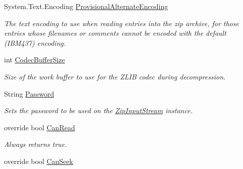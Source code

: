 \begin{DoxyCompactItemize}
\item 
System.\+Text.\+Encoding \mbox{\hyperlink{class_super_tiled2_unity_1_1_ionic_1_1_zip_1_1_zip_input_stream_a0b2b02e8e22ba92c63f7a77852abf062}{Provisional\+Alternate\+Encoding}}
\begin{DoxyCompactList}\small\item\em The text encoding to use when reading entries into the zip archive, for those entries whose filenames or comments cannot be encoded with the default (I\+B\+M437) encoding. \end{DoxyCompactList}\item 
int \mbox{\hyperlink{class_super_tiled2_unity_1_1_ionic_1_1_zip_1_1_zip_input_stream_af44fff57aee1d3076896571b3e102937}{Codec\+Buffer\+Size}}
\begin{DoxyCompactList}\small\item\em Size of the work buffer to use for the Z\+L\+IB codec during decompression. \end{DoxyCompactList}\item 
String \mbox{\hyperlink{class_super_tiled2_unity_1_1_ionic_1_1_zip_1_1_zip_input_stream_a152dfe460b16330a160db99eeffcf07c}{Password}}
\begin{DoxyCompactList}\small\item\em Sets the password to be used on the {\ttfamily \mbox{\hyperlink{class_super_tiled2_unity_1_1_ionic_1_1_zip_1_1_zip_input_stream}{Zip\+Input\+Stream}}} instance. \end{DoxyCompactList}\item 
override bool \mbox{\hyperlink{class_super_tiled2_unity_1_1_ionic_1_1_zip_1_1_zip_input_stream_a5d96ce8da0a2f65670eddfc56dae1a21}{Can\+Read}}
\begin{DoxyCompactList}\small\item\em Always returns true. \end{DoxyCompactList}\item 
override bool \mbox{\hyperlink{class_super_tiled2_unity_1_1_ionic_1_1_zip_1_1_zip_input_stream_ac37e847bafaafa0cf3f7713f5e6119e2}{Can\+Seek}}

\end{DoxyCompactItemize}
